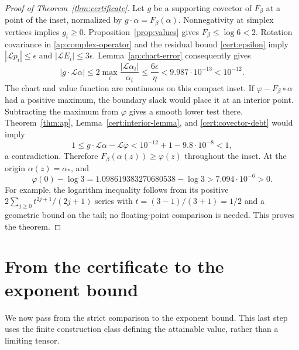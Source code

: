 \documentclass[11pt]{article}
\numberwithin{equation}{section}
\theoremstyle{definition}
\theoremstyle{remark}
\begin{document}
\begin{proof}[Proof of Theorem~\ref{thm:certificate}]
Let $g$ be a supporting covector of $F_\beta$ at a point of the inset,
normalized by $g\cdot\alpha=F_\beta(\alpha)$.  Nonnegativity at simplex
vertices implies $g_i\geq0$.  Proposition~\ref{prop:values} gives
$F_\beta\leq\log6<2$.  Rotation covariance in
\eqref{ap:complex-operator} and the residual bound \eqref{cert:epsilon} imply
$|\mathcal Lp_i|\leq\epsilon$ and
$|\mathcal LE_i|\leq3\epsilon$.  Lemma~\ref{ap:chart-error} consequently
gives
\begin{equation}\label{cert:covector-debt}
 |g\cdot\mathcal L\alpha|
 \leq2\max_i\frac{|\mathcal L\alpha_i|}{\alpha_i}
 \leq\frac{6\epsilon}{\eta}
 <9.987\cdot10^{-13}<10^{-12}.
\end{equation}
The chart and value function are continuous on this compact inset.
If $\varphi-F_\beta\circ\alpha$ had a positive maximum, the boundary
slack would place it at an interior point.  Subtracting the maximum from
$\varphi$ gives a smooth lower test there.  Theorem~\ref{thm:ap},
Lemma~\ref{cert:interior-lemma}, and \eqref{cert:covector-debt} would imply
\[
 1\leq g\cdot\mathcal L\alpha-\mathcal L\varphi
       <10^{-12}+1-9.8\cdot10^{-8}<1,
\]
a contradiction.  Therefore $F_\beta(\alpha(z))\geq\varphi(z)$ throughout
the inset.  At the origin $\alpha(z)=\alpha_*$, and
\[
 \varphi(0)-\log3
 =1.098619383270680538-\log3>7.094\cdot10^{-6}>0.
\]
For example, the logarithm inequality follows from its positive
$2\sum_{j\geq0}t^{2j+1}/(2j+1)$ series with $t=(3-1)/(3+1)=1/2$ and
a geometric bound on the tail; no floating-point comparison is needed.
This proves the theorem.
\end{proof}

\section{From the certificate to the exponent bound}\label{sec:conclusion}

We now pass from the strict comparison to the exponent bound.
This last step uses the finite construction class defining the attainable
value, rather than a limiting tensor.
\end{document}
